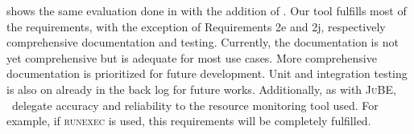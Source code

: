  shows the same evaluation done in  with the addition of \OurBenchmarkingTool.
Our tool fulfills most of the requirements, with the exception of Requirements 2e and 2j, respectively comprehensive documentation and testing.
Currently, the documentation is not yet comprehensive but is adequate for most use cases.
More comprehensive documentation is prioritized for future development.
Unit and integration testing is also on already in the back log for future works.
Additionally, as with \textsc{JuBE}, \first~delegate accuracy and reliability to the resource monitoring tool used.
For example, if \textsc{runexec} is used, this requirements will be completely fulfilled.
